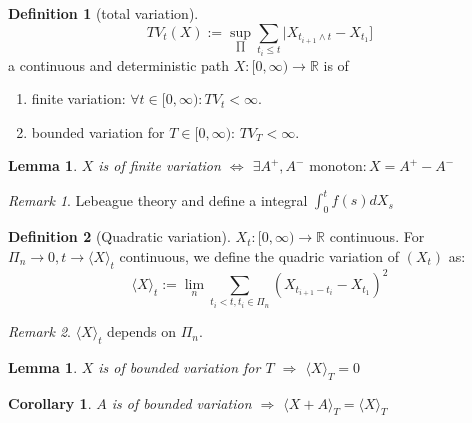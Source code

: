 \documentclass[a4paper,11pt]{book}
\newtheorem{corollary}{Corollary}[theorem]
\newtheorem{lemma}[theorem]{Lemma}
\theoremstyle{definition}
\newtheorem{definition}{Definition}[section]
\theoremstyle{remark}
\newtheorem*{remark}{Remark}
\begin{document}
\begin{definition}[total variation]
	\begin{equation*}
		TV_t(X) := \sup_{\prod}\sum_{t_i \leq t}|X_{t_{i+1} \wedge t} - X_{t_1}]
	\end{equation*}
	a continuous and deterministic path $X: [0, \infty) \rightarrow \mathbb{R}$ is of 
	\begin{enumerate}
		\item  finite variation: $\forall t \in [0, \infty): TV_t < \infty$.
		\item bounded variation for $T \in [0, \infty)$: $TV_T < \infty$. 
	\end{enumerate}
\end{definition}

\begin{lemma}
	$X$ is of finite variation $\Leftrightarrow$ $\exists A^+, A^- \text{ monoton}: X = A^+ - A^-$
\end{lemma}
\begin{remark}
Lebeague theory and define a integral $\int_0^t f(s) dX_s $	
\end{remark}

\begin{definition}[Quadratic variation]
	$X_t: [0, \infty) \rightarrow \mathbb{R}$ continuous. For $\Pi_n \rightarrow 0, t \rightarrow \langle X \rangle_t$ continuous, we define the quadric variation of $(X_t)$ as:
	\begin{equation*}
		\langle X \rangle_t := \lim_n \sum_{t_i < t, t_i \in \Pi_n} (X_{t_{i+1} - t_i} - X_{t_1})^2 
	\end{equation*}
\end{definition}
\begin{remark}
$\langle X \rangle_t$ depends on $\Pi_n$.	
\end{remark}

\begin{lemma}
	$X$ is of bounded variation for $T$ $\Rightarrow$ $\langle X \rangle_T = 0$ 
\end{lemma}

\begin{corollary}
	$A$ is of bounded variation $\Rightarrow$ $\langle X + A \rangle_T = \langle X \rangle_T$
\end{corollary}
\end{document}
